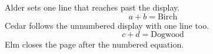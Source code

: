 \documentclass{article}
\begin{document}
Alder sets one line that reaches past the display.
\[ a + b = \text{Birch} \]
Cedar follows the unnumbered display with one line too.
\begin{equation} c + d = \text{Dogwood} \end{equation}
Elm closes the page after the numbered equation.
\end{document}
